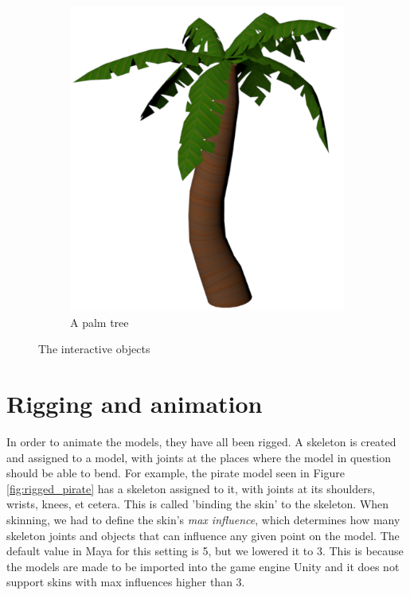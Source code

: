 \begin{figure}[h!]
\begin{subfigure}[b]{0.3\textwidth}
    \end{subfigure}
    \begin{subfigure}[b]{0.3\textwidth}
    	\centering
        \includegraphics[scale=0.2]{figures/PalmTree.png}\caption{A palm tree\label{fig:palmtree}}
    \end{subfigure}
\caption{The interactive objects}\label{fig:objects}
\end{figure}

\pagebreak
\section{Rigging and animation}
In order to animate the models, they have all been rigged. A skeleton is created and assigned to a model, with joints at the places where the model in question should be able to bend. For example, the pirate model seen in Figure \ref{fig:rigged_pirate} has a skeleton assigned to it, with joints at its shoulders, wrists, knees, et cetera. This is called 'binding the skin' to the skeleton. When skinning, we had to define the skin's \textit{max influence}, which determines how many skeleton joints and objects that can influence any given point on the model. The default value in Maya for this setting is 5, but we lowered it to 3. This is because the models are made to be imported into the game engine Unity \cite{Technologies2016} and it does not support skins with max influences higher than 3.

